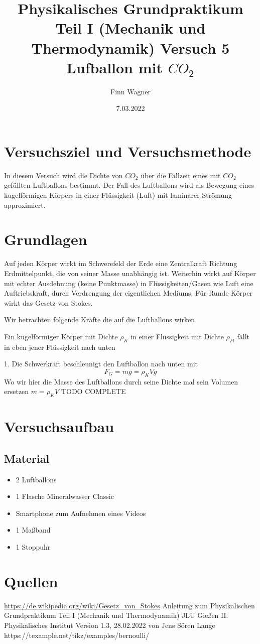 \documentclass{article}
\date{7.03.2022}
\title{Physikalisches Grundpraktikum Teil I (Mechanik und Thermodynamik) Versuch 5 Lufballon mit \(CO_2\)}
\author{Finn Wagner}
\begin{document}
    \maketitle

    \section{Versuchsziel und Versuchsmethode}
    In diesem Versuch wird die Dichte von \(CO_2\) über die Fallzeit eines mit \(CO_2\) gefüllten Luftballons bestimmt.
    Der Fall des Luftballons wird als Bewegung eines kugelförmigen Körpers in einer Flüssigkeit (Luft) mit laminarer Strömung approximiert.

    \section{Grundlagen}
    Auf jeden Körper wirkt im Schwerefeld der Erde eine Zentralkraft Richtung Erdmittelpunkt, die von seiner Masse unabhängig ist.
    Weiterhin wirkt auf Körper mit echter Ausdehnung (keine Punktmasse) in Flüssigkeiten/Gasen wie Luft eine Auftriebskraft, 
    durch Verdrengung der eigentlichen Mediums.
    Für Runde Körper wirkt das Gesetz von Stokes.

    Wir betrachten folgende Kräfte die auf die Luftballons wirken

    Ein kugelförmiger Körper mit Dichte \(\rho_K\) in einer Flüssigkeit mit Dichte \(\rho_{Fl}\) fällt in eben jener Flüssigkeit nach unten

    1. Die Schwerkraft beschleunigt den Luftballon nach unten mit
    \[ F_G = mg = \rho_K V g \]
    Wo wir hier die Masse des Luftballons durch seine Dichte mal sein Volumen ersetzen \( m = \rho_K V \)
    TODO COMPLETE

    \section{Versuchsaufbau}
        \subsection{Material}
        \begin{itemize}
            \item 2 Luftballons
            \item 1 Flasche Mineralwasser Classic
            \item Smartphone zum Aufnehmen eines Videos
            \item 1 Maßband
            \item 1 Stoppuhr
        \end{itemize}

        


    \section{Quellen}
    \url{https://de.wikipedia.org/wiki/Gesetz_von_Stokes}
    Anleitung zum Physikalischen Grundpraktikum Teil I (Mechanik und Thermodynamik) JLU Gießen II. Physikalisches Institut Version 1.3, 28.02.2022 von Jens Sören Lange
    https://texample.net/tikz/examples/bernoulli/
\end{document}

